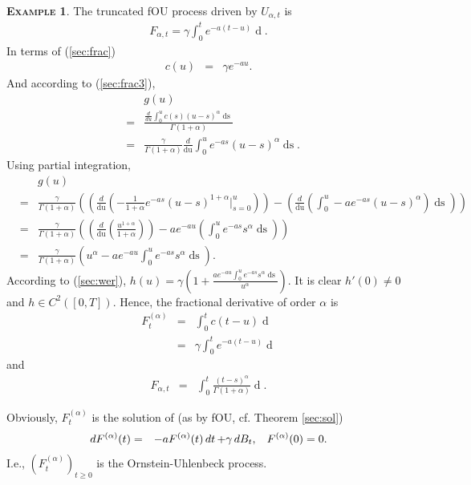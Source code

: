 \documentclass[a4paper, twoside, 11pt]{article}
\theoremstyle{definition}
\newtheorem{example}[definition]{\scshape Example}
\newcommand{\brkt}[1]{\left({#1} \right)}
\begin{document}
	\begin{example}
	The truncated fOU process driven by $U_{\alpha, t}$ is 
	\begin{eqnarray}
	F_{\alpha,t} = \gamma\int_0^t e^{-a(t-u)}\mathop{dU_{\alpha, u}} .
	\label{sec:cc2}
  \end{eqnarray}
  In terms of (\ref{sec:frac})
  \begin{eqnarray*}
	c(u) &=&  \gamma e^{-au}.
  \end{eqnarray*}
  And according to  (\ref{sec:frac3}),
  \begin{eqnarray*}
	&&g(u)\\
	&=& \frac{\frac{d}{du}\int_0^{u} c(s)(u-s)^\alpha \mathop{ds}}{\Gamma(1+\alpha)}\\
	&=& \frac{\gamma}{\Gamma(1+\alpha)}\frac{d}{\mathop{du}}\int_0^u e^{-as} (u-s)^\alpha \mathop{ds}.
  \end{eqnarray*}
  Using partial integration,
  \begin{eqnarray*}
	&&g(u)\\
	&=& \frac{\gamma}{\Gamma(1+\alpha)}\brkt{\brkt{\frac{d}{\mathop{du}} (-\frac{1}{1+\alpha}e^{-as}(u-s)^{1+\alpha}|_{s=0}^u)} - \brkt{\frac{d}{\mathop{du}}(\int_0^u -a e^{-as}(u-s)^\alpha)\mathop{ds}}}\\
	&=& \frac{\gamma}{\Gamma(1+\alpha)}\brkt{\brkt{\frac{d}{\mathop{du}}(\frac{u^{1+\alpha}}{1+\alpha})} - a e^{-au}\brkt{\int_0^u e^{-as}s^\alpha\mathop{ds}}}\\
	&=& \frac{\gamma}{\Gamma(1+\alpha)} (u^\alpha - a e^{-au}\int_0^u e^{-as}s^\alpha\mathop{ds}).
  \end{eqnarray*}
  According to (\ref{sec:wer}), $h(u) = \gamma (1 + \frac{a e^{-au}\int_0^u e^{-as}s^\alpha\mathop{ds}}{u^\alpha})$. It is clear $h'(0)\neq 0$ and $h\in C^2([0,T])$. Hence, the fractional derivative of order $\alpha$ is 
  \begin{eqnarray}
	F^{(\alpha)}_t &=&  \int_0^t c(t-u) \mathop{dB_u}\nonumber\\
	&=& \gamma\int_0^t e^{-a(t-u)}\mathop{dB_u}
	\label{sec:wie}
  \end{eqnarray}
  and 
  \begin{eqnarray}
	F_{\alpha,t} &=& \int_0^t \frac{(t-s)^\alpha}{\Gamma(1+\alpha)} \mathop{dF^{(\alpha)}(s)}.
	\label{sec:was}
  \end{eqnarray}

  Obviously, $F^{(\alpha)}_t$ is the solution of  (as by fOU, cf. Theorem \ref{sec:sol})
  \begin{eqnarray}
	dF^{(\alpha)}(t) &=& -a F^{(\alpha)}(t)\mathop{dt} + \gamma \mathop{dB_t},\hspace{3mm}F^{(\alpha)}(0)=0.
	\label{sec:cont3}
  \end{eqnarray}
  I.e., $(F^{(\alpha)}_t)_{t\ge 0}$ is the Ornstein-Uhlenbeck process.
  \end{example}
\end{document}
